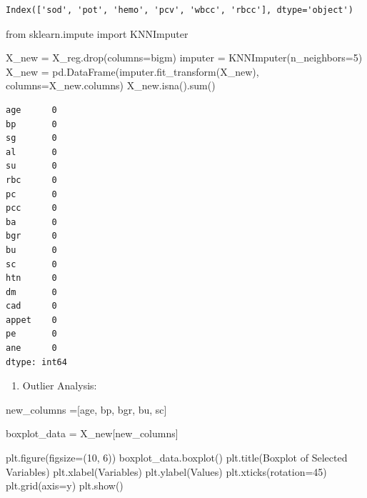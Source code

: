 \documentclass[
  11pt,
  letterpaper,
  DIV=11,
  numbers=noendperiod]{scrartcl}
\newenvironment{Shaded}{\begin{snugshade}}{\end{snugshade}}
\newcommand{\BuiltInTok}[1]{\textcolor[rgb]{0.00,0.23,0.31}{#1}}
\newcommand{\DecValTok}[1]{\textcolor[rgb]{0.68,0.00,0.00}{#1}}
\newcommand{\ImportTok}[1]{\textcolor[rgb]{0.00,0.46,0.62}{#1}}
\newcommand{\NormalTok}[1]{\textcolor[rgb]{0.00,0.23,0.31}{#1}}
\newcommand{\OperatorTok}[1]{\textcolor[rgb]{0.37,0.37,0.37}{#1}}
\newcommand{\StringTok}[1]{\textcolor[rgb]{0.13,0.47,0.30}{#1}}
\providecommand{\tightlist}{%
  \setlength{\itemsep}{0pt}\setlength{\parskip}{0pt}}\usepackage{longtable,booktabs,array}
\begin{document}
\begin{verbatim}
Index(['sod', 'pot', 'hemo', 'pcv', 'wbcc', 'rbcc'], dtype='object')
\end{verbatim}

\begin{Shaded}
\begin{Highlighting}[]
\ImportTok{from}\NormalTok{ sklearn.impute }\ImportTok{import}\NormalTok{ KNNImputer}

\NormalTok{X\_new }\OperatorTok{=}\NormalTok{ X\_reg.drop(columns}\OperatorTok{=}\NormalTok{bigm)}
\NormalTok{imputer }\OperatorTok{=}\NormalTok{ KNNImputer(n\_neighbors}\OperatorTok{=}\DecValTok{5}\NormalTok{)}
\NormalTok{X\_new }\OperatorTok{=}\NormalTok{ pd.DataFrame(imputer.fit\_transform(X\_new), columns}\OperatorTok{=}\NormalTok{X\_new.columns)}
\NormalTok{X\_new.isna().}\BuiltInTok{sum}\NormalTok{()}
\end{Highlighting}
\end{Shaded}

\begin{verbatim}
age      0
bp       0
sg       0
al       0
su       0
rbc      0
pc       0
pcc      0
ba       0
bgr      0
bu       0
sc       0
htn      0
dm       0
cad      0
appet    0
pe       0
ane      0
dtype: int64
\end{verbatim}

\begin{enumerate}
\def\labelenumi{\arabic{enumi}.}
\setcounter{enumi}{5}
\tightlist
\item
  Outlier Analysis:
\end{enumerate}

\begin{Shaded}
\begin{Highlighting}[]
\NormalTok{new\_columns }\OperatorTok{=}\NormalTok{[}\StringTok{\textquotesingle{}age\textquotesingle{}}\NormalTok{, }\StringTok{\textquotesingle{}bp\textquotesingle{}}\NormalTok{, }\StringTok{\textquotesingle{}bgr\textquotesingle{}}\NormalTok{, }\StringTok{\textquotesingle{}bu\textquotesingle{}}\NormalTok{, }\StringTok{\textquotesingle{}sc\textquotesingle{}}\NormalTok{]}

\NormalTok{boxplot\_data }\OperatorTok{=}\NormalTok{ X\_new[new\_columns]}

\NormalTok{plt.figure(figsize}\OperatorTok{=}\NormalTok{(}\DecValTok{10}\NormalTok{, }\DecValTok{6}\NormalTok{)) }
\NormalTok{boxplot\_data.boxplot()}
\NormalTok{plt.title(}\StringTok{\textquotesingle{}Boxplot of Selected Variables\textquotesingle{}}\NormalTok{)}
\NormalTok{plt.xlabel(}\StringTok{\textquotesingle{}Variables\textquotesingle{}}\NormalTok{)}
\NormalTok{plt.ylabel(}\StringTok{\textquotesingle{}Values\textquotesingle{}}\NormalTok{)}
\NormalTok{plt.xticks(rotation}\OperatorTok{=}\DecValTok{45}\NormalTok{)  }
\NormalTok{plt.grid(axis}\OperatorTok{=}\StringTok{\textquotesingle{}y\textquotesingle{}}\NormalTok{)  }
\NormalTok{plt.show()}
\end{Highlighting}
\end{Shaded}
\end{document}

